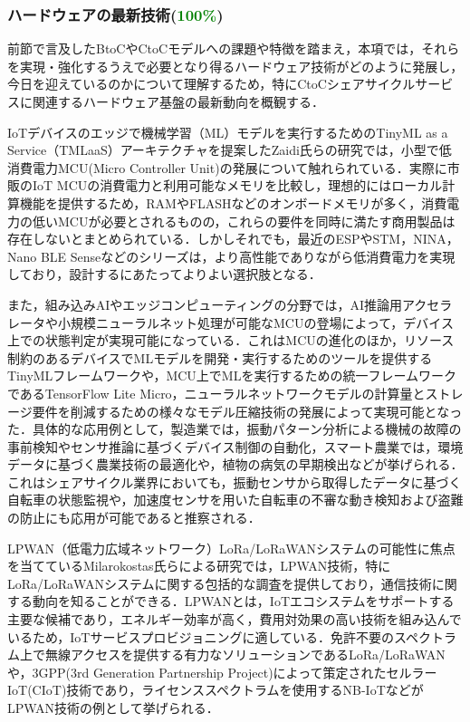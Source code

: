       \subsubsection{ハードウェアの最新技術(\textcolor{green}{100\%})}
        \label{sec:ハードウェアの最新技術}
          \par 前節で言及したBtoCやCtoCモデルへの課題や特徴を踏まえ，本項では，それらを実現・強化するうえで必要となり得るハードウェア技術がどのように発展し，今日を迎えているのかについて理解するため，特にCtoCシェアサイクルサービスに関連するハードウェア基盤の最新動向を概観する．
          \par IoTデバイスのエッジで機械学習（ML）モデルを実行するためのTinyML as a Service（TMLaaS）アーキテクチャを提案したZaidi氏らの研究では，小型で低消費電力MCU(Micro Controller Unit)の発展について触れられている．実際に市販のIoT MCUの消費電力と利用可能なメモリを比較し，理想的にはローカル計算機能を提供するため，RAMやFLASHなどのオンボードメモリが多く，消費電力の低いMCUが必要とされるものの，これらの要件を同時に満たす商用製品は存在しないとまとめられている．しかしそれでも，最近のESPやSTM，NINA，Nano BLE Senseなどのシリーズは，より高性能でありながら低消費電力を実現しており，設計するにあたってよりよい選択肢となる．
          \par また，組み込みAIやエッジコンピューティングの分野では，AI推論用アクセラレータや小規模ニューラルネット処理が可能なMCUの登場によって，デバイス上での状態判定が実現可能になっている．これはMCUの進化のほか，リソース制約のあるデバイスでMLモデルを開発・実行するためのツールを提供するTinyMLフレームワークや，MCU上でMLを実行するための統一フレームワークであるTensorFlow Lite Micro，ニューラルネットワークモデルの計算量とストレージ要件を削減するための様々なモデル圧縮技術の発展によって実現可能となった．具体的な応用例として，製造業では，振動パターン分析による機械の故障の事前検知やセンサ推論に基づくデバイス制御の自動化，スマート農業では，環境データに基づく農業技術の最適化や，植物の病気の早期検出などが挙げられる．これはシェアサイクル業界においても，振動センサから取得したデータに基づく自転車の状態監視や，加速度センサを用いた自転車の不審な動き検知および盗難の防止にも応用が可能であると推察される．
          \par LPWAN（低電力広域ネットワーク）LoRa/LoRaWANシステムの可能性に焦点を当てているMilarokostas氏らによる研究では，LPWAN技術，特にLoRa/LoRaWANシステムに関する包括的な調査を提供しており，通信技術に関する動向を知ることができる．LPWANとは，IoTエコシステムをサポートする主要な候補であり，エネルギー効率が高く，費用対効果の高い技術を組み込んでいるため，IoTサービスプロビジョニングに適している．免許不要のスペクトラム上で無線アクセスを提供する有力なソリューションであるLoRa/LoRaWANや，3GPP(3rd Generation Partnership Project)によって策定されたセルラーIoT(CIoT)技術であり，ライセンススペクトラムを使用するNB-IoTなどがLPWAN技術の例として挙げられる．
